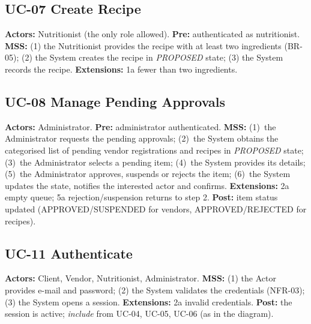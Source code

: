 \subsection*{UC-07 Create Recipe}
\textbf{Actors:} Nutritionist (the only role allowed). \textbf{Pre:}
authenticated as nutritionist. \textbf{MSS:} (1) the Nutritionist provides the
recipe with at least two ingredients (BR-05); (2) the System creates the
recipe in \emph{PROPOSED} state; (3) the System records the recipe.
\textbf{Extensions:} 1a fewer than two ingredients.

\subsection*{UC-08 Manage Pending Approvals}
\textbf{Actors:} Administrator. \textbf{Pre:} administrator authenticated.
\textbf{MSS:} (1)~the Administrator requests the pending approvals;
(2)~the System obtains the categorised list of pending vendor registrations
and recipes in \emph{PROPOSED} state; (3)~the Administrator selects a pending
item; (4)~the System provides its details; (5)~the Administrator approves,
suspends or rejects the item; (6)~the System updates the state, notifies the
interested actor and confirms. \textbf{Extensions:} 2a empty queue; 5a
rejection/suspension returns to step 2. \textbf{Post:} item status updated
(APPROVED/SUSPENDED for vendors, APPROVED/REJECTED for recipes).

\subsection*{UC-11 Authenticate}
\textbf{Actors:} Client, Vendor, Nutritionist, Administrator. \textbf{MSS:} (1) the Actor provides
e-mail and password; (2) the System validates the credentials (NFR-03);
(3) the System opens a session. \textbf{Extensions:} 2a invalid credentials.
\textbf{Post:} the session is active; \emph{include} from UC-04, UC-05, UC-06 (as in the diagram).
